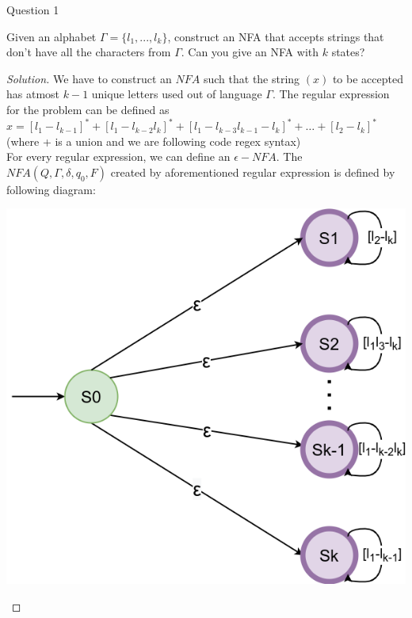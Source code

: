 \begin{solution}{Question 1}\label{ques:1}
    \begin{question}
    Given an alphabet $\Gamma = \{l_1,...,l_k\} $, construct an NFA that accepts strings that don’t have all the characters from $\Gamma$. Can you give an NFA with $k$ states?
    \end{question}
    \tcblower{}
    \begin{proof}[Solution]
    We have to construct an $NFA$ such that the string $(x)$ to be accepted has atmost $k-1$ unique letters used out of language $\Gamma$. The regular expression for the problem can be defined as $x = [l_1-l_{k-1}]^*+ [l_1-l_{k-2}l_k]^* + [l_1-l_{k-3}l_{k-1}-l_{k}]^* + \dots + [l_2-l_k]^*$\\
    (where + is a union and we are following code regex syntax)\\
    For every regular expression, we can define an $\epsilon-NFA$. The $NFA (Q, \Gamma, \delta, q_0, F)$ created by aforementioned regular expression is defined by following diagram:
    \begin{center}
        \includegraphics[scale=0.6]{NFA.png}
    \end{center}
    
    
    \end{proof}
\end{solution}
